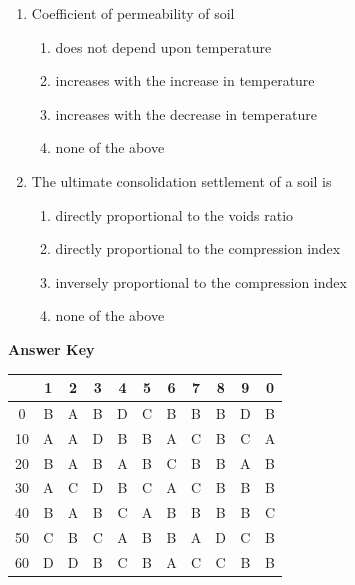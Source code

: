 \documentclass[11pt,a4paper]{article}
\begin{document}
\begin{enumerate}
\begin{enumerate}[label=\Alph*.]
\end{enumerate}
\item{Coefficient of permeability of soil}
\begin{enumerate}[label=\Alph*.]
\item{does not depend upon temperature}
\item{increases with the increase in temperature}
\item{increases with the decrease in temperature}
\item{none of the above}
\end{enumerate}
\item{The ultimate consolidation settlement of a soil is}
\begin{enumerate}[label=\Alph*.]
\item{directly proportional to the voids ratio}
\item{directly proportional to the compression index}
\item{inversely proportional to the compression index}
\item{none of the above}
\end{enumerate}
\end{enumerate}
\textbf{Answer Key}
\begin{tabular}{ | c | c c c c c c c c c c | }
\hline
 & 1 & 2 & 3 & 4 & 5 & 6 & 7 & 8 & 9 & 0 \\
\hline
0 & B & A & B & D & C & B & B & B & D & B \\
10 & A & A & D & B & B & A & C & B & C & A \\
20 & B & A & B & A & B & C & B & B & A & B \\
30 & A & C & D & B & C & A & C & B & B & B \\
40 & B & A & B & C & A & B & B & B & B & C \\
50 & C & B & C & A & B & B & A & D & C & B \\
60 & D & D & B & C & B & A & C & C & B & B \\
\hline
\end{tabular}
\clearpage
\end{document}
